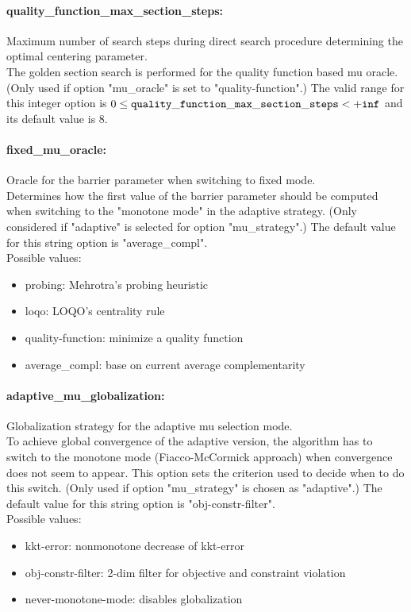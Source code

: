 \paragraph{quality\_function\_max\_section\_steps:}\label{opt:quality_function_max_section_steps} Maximum number of search steps during direct search procedure determining the optimal centering parameter. \\
 The golden section search is performed for the quality function based mu oracle. (Only used if option "mu\_oracle" is set to "quality-function".) The valid range for this integer option is
$0 \le {\tt quality\_function\_max\_section\_steps } <  {\tt +inf}$
and its default value is $8$.


\paragraph{fixed\_mu\_oracle:}\label{opt:fixed_mu_oracle} Oracle for the barrier parameter when switching to fixed mode. \\
 Determines how the first value of the barrier parameter should be computed when switching to the "monotone mode" in the adaptive strategy. (Only considered if "adaptive" is selected for option "mu\_strategy".) The default value for this string option is "average\_compl".
\\ 
Possible values:
\begin{itemize}
   \item probing: Mehrotra's probing heuristic
   \item loqo: LOQO's centrality rule
   \item quality-function: minimize a quality function
   \item average\_compl: base on current average complementarity
\end{itemize}

\paragraph{adaptive\_mu\_globalization:}\label{opt:adaptive_mu_globalization} Globalization strategy for the adaptive mu selection mode. \\
 To achieve global convergence of the adaptive version, the algorithm has to switch to the monotone mode (Fiacco-McCormick approach) when convergence does not seem to appear.  This option sets the criterion used to decide when to do this switch. (Only used if option "mu\_strategy" is chosen as "adaptive".) The default value for this string option is "obj-constr-filter".
\\ 
Possible values:
\begin{itemize}
   \item kkt-error: nonmonotone decrease of kkt-error
   \item obj-constr-filter: 2-dim filter for objective and constraint violation
   \item never-monotone-mode: disables globalization
\end{itemize}

